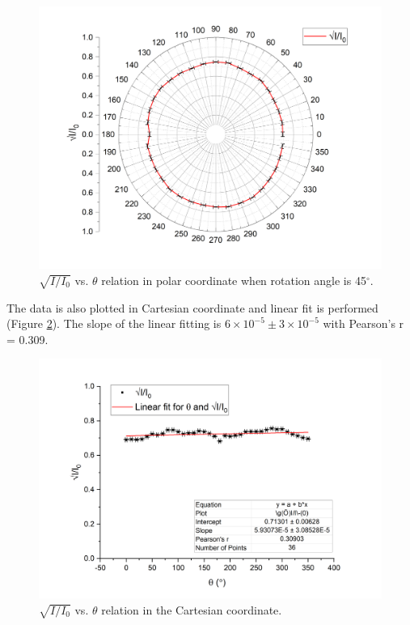 \documentclass{article}
\begin{document}
\begin{figure}[H]\centering
\includegraphics[scale=0.45]{5.png}
\caption{$\sqrt{I/I_0}$ vs. $\theta$ relation in polar coordinate when rotation angle is 45$^\circ$.}\label{Fig45}
\end{figure}

The data is also plotted in Cartesian coordinate and linear fit is performed (Figure \ref{Fig45l}). The slope of the linear fitting is $6 \times 10^{-5} \pm 3 \times 10^{-5}$ with Pearson's r = 0.309.

\begin{figure}[H]\centering
\includegraphics[scale=0.55]{6.png}
\caption{$\sqrt{I/I_0}$ vs. $\theta$ relation in the Cartesian coordinate.}\label{Fig45l}
\end{figure}
\end{document}
